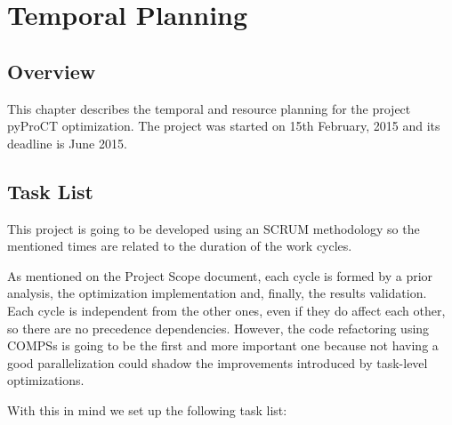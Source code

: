 \chapter{Temporal Planning}
\label{sec:temporal_planning}

\section{Overview}

This chapter describes the temporal and resource planning for the project pyProCT optimization. The project was started on 15th February, 2015 and its deadline is June 2015.

\section{Task List}

This project is going to be developed using an SCRUM methodology so the mentioned times are related to the duration of the work cycles. 

As mentioned on the Project Scope document, each cycle is formed by a prior analysis, the optimization implementation and, finally, the results validation. Each cycle is independent from the other ones, even if they do affect each other, so there are no precedence dependencies. However, the code refactoring using COMPSs is going to be the first and more important one because not having a good parallelization could shadow the improvements introduced by task-level optimizations. 

With this in mind we set up the following task list:

